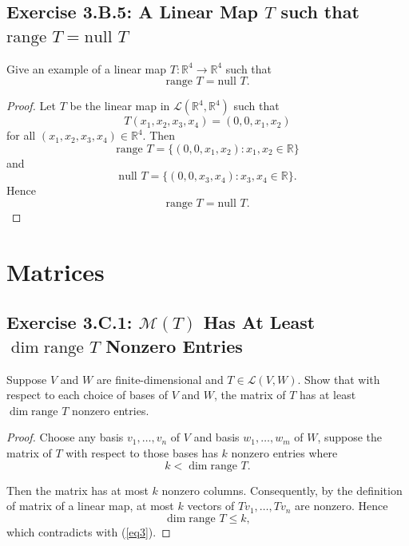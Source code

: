 \section{Exercise 3.B.5: A Linear Map $T$ such that $\text{range }T=\text{null }T$}
Give an example of a linear map $T:\mathbb{R}^4\to\mathbb{R}^4$ such that\[
\text{range }T=\text{null }T.
\]
\begin{proof}
Let $T$ be the linear map in $\mathcal{L}(\mathbb{R}^4,\mathbb{R}^4)$ such that\[
T(x_1,x_2,x_3,x_4)=(0, 0, x_1,x_2)
\]for all $(x_1,x_2,x_3,x_4)\in\mathbb{R}^4$. Then\[
\text{range }T=\{(0, 0, x_1,x_2):x_1,x_2\in\mathbb{R}\}
\]and\[
\text{null }T=\{(0,0,x_3,x_4):x_3,x_4\in\mathbb{R}\}.
\]Hence\[
\text{range }T=\text{null }T.
\]
\end{proof}

\chapter{Matrices}
\section{Exercise 3.C.1: $\mathcal{M}(T)$ Has At Least $\dim\text{range }T$ Nonzero Entries}
Suppose $V$ and $W$ are finite-dimensional and $T\in\mathcal{L}(V,W)$. Show that with respect to each choice of bases of $V$ and $W$, the matrix of $T$ has at least $\dim\text{range }T$ nonzero entries.
\begin{proof}
Choose any basis $v_1,\dots,v_n$ of $V$ and basis $w_1,\dots,w_m$ of $W$, suppose the matrix of $T$  with respect to those bases has $k$ nonzero entries where
\begin{equation}\label{eq3}
k<\dim\text{range }T.
\end{equation}

Then the matrix has at most $k$ nonzero columns. Consequently, by the definition of matrix of a linear map, at most $k$ vectors of $Tv_1,\dots,Tv_n$ are nonzero. Hence\[\dim\text{range }T\leqslant k,\]which contradicts with (\ref{eq3}).
\end{proof}

